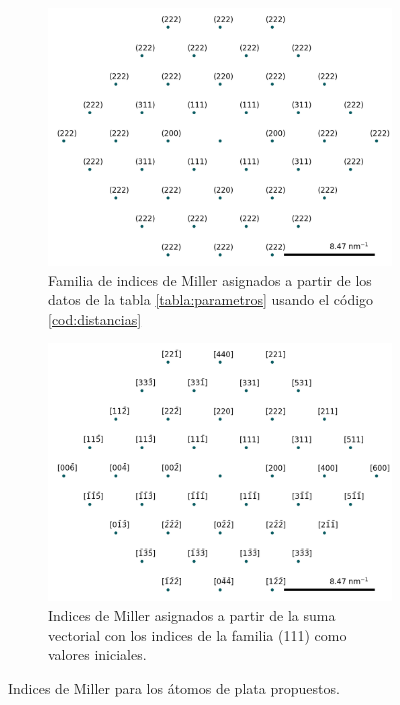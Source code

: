 \documentclass[reprint,amsmath,amssymb,aps,]{revtex4-2}
\begin{document}
\begin{figure}
    \begin{subfigure}[H]{0.45\linewidth}
    \includegraphics[scale=0.45]{../Graphics/indices.png}
    \caption{Familia de indices de Miller asignados a partir de los datos de la tabla \ref{tabla:parametros} usando el código \ref{cod:distancias}}
    \label{fig:indicesmiller}
    \end{subfigure}
    \hspace{1cm}
    \begin{subfigure}[H]{0.45\linewidth}
    \includegraphics[scale=0.45]{../Graphics/lattice.png}
    \caption{Indices de Miller asignados a partir de la suma vectorial con los indices de la familia (111) como valores iniciales.}
    \label{fig:lattice}
    \end{subfigure}
    \caption{Indices de Miller para los \'atomos de plata propuestos.}
\end{figure}
\end{document}
